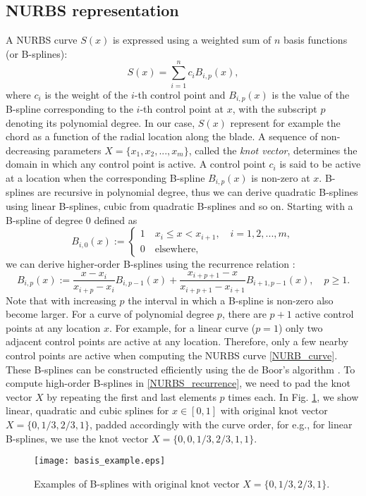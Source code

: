 \subsection{NURBS representation}
A NURBS curve $S(x)$ is expressed using a weighted sum of $n$ basis functions (or B-splines):
\begin{equation}\label{NURB_curve}
S(x) = \sum_{i=1}^{n} c_i B_{i,p}(x),
\end{equation}
where $c_i$ is the weight of the $i$-th control point and $B_{i,p}(x)$ is the value of the B-spline corresponding to the $i$-th control point at $x$, with the subscript $p$ denoting its polynomial degree.  In our case, $S(x)$ represent for example the chord as a function of the radial location along the blade. A sequence of non-decreasing parameters $X = \{x_1,x_2,...,x_m\}$, called the \textit{knot vector}, determines the domain in which any control point is active. A control point $c_i$ is said to be active at a location when the corresponding B-spline $B_{i,p}(x)$ is non-zero at $x$. B-splines are recursive in polynomial degree, thus we can derive quadratic B-splines using linear B-splines, cubic from quadratic B-splines and so on. Starting with a B-spline of degree 0 defined as 
\begin{equation}\label{linearBspline}
B_{i,0}(x) :=
\begin{cases}
1\quad x_i\leq x < x_{i+1},\quad i = 1,2,...,m,\\
0\quad\text{elsewhere,}
\end{cases} 
\end{equation}
we can derive higher-order B-splines using the recurrence relation \cite{deBoor}:
\begin{equation}\label{NURBS_recurrence}
B_{i,p}(x) := \frac{x - x_i}{x_{i+p} - x_i}B_{i,p-1}(x) + \frac{x_{i+p+1} - x}{x_{i+p+1} - x_{i+1}}B_{i+1,p-1}(x),\quad p\geq1.
\end{equation}
Note that with increasing $p$ the interval in which a B-spline is non-zero also become larger. For a curve of polynomial degree $p$, there are $p+1$ active control points at any location $x$. For example, for a linear curve ($p=1$) only two adjacent control points are active at any location. Therefore, only a few nearby control points are active when computing the NURBS curve \eqref{NURB_curve}. These B-splines can be constructed efficiently using the de Boor's algorithm \cite{deBoor}. To compute high-order B-splines in \eqref{NURBS_recurrence}, we need to pad the knot vector $X$ by repeating the first and last elements $p$ times each. In Fig. \ref{basis_examples}, we show linear, quadratic and cubic splines for $x\in[0,1]$ with original knot vector $X = \{0,1/3,2/3,1\}$, padded accordingly with the curve order, for e.g., for linear B-splines, we use the knot vector $X = \{0,0,1/3,2/3,1,1\}$.
\begin{figure}[h!]
\centering
\texttt{[image: basis\_example.eps]}
\caption{Examples of B-splines with original knot vector $X = \{0,1/3,2/3,1\}$.}
\label{basis_examples}
\end{figure}

